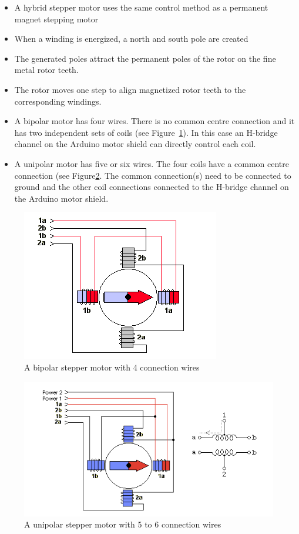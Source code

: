 \documentclass{instructions}
\begin{document}
\begin{itemize}
\item A hybrid stepper motor uses the same control method as a permanent magnet
    stepping motor

\item When a winding is energized, a north and south pole are created

\item The generated poles attract the permanent poles of the rotor on the fine
    metal rotor teeth.

\item The rotor moves one step to align magnetized rotor teeth to the
    corresponding windings.

\item A bipolar motor has four wires. There is no common centre connection and
    it has two independent sets of coils (see Figure~\ref{bipolar}). In this
        case an H-bridge channel on the Arduino motor shield can directly
        control each coil.

\item A unipolar motor has five or six wires. The four coils have a
    common centre connection (see Figure\ref{unipolar}. The common connection(s)
        need to be connected to ground and the other coil connections connected
        to the H-bridge channel on the Arduino motor shield.

\end{itemize}

\begin{figure}[h!]
    \centering
    \includegraphics[width=0.5\linewidth]{figs/bipolar.png}
    \caption{A bipolar stepper motor with 4 connection wires}
    \label{bipolar}
\end{figure}


\begin{figure}[h!]
    \centering
    \includegraphics[width=0.7\linewidth]{figs/unipolar.png}
    \caption{A unipolar stepper motor with 5 to 6 connection wires}
    \label{unipolar}
\end{figure}
\end{document}
